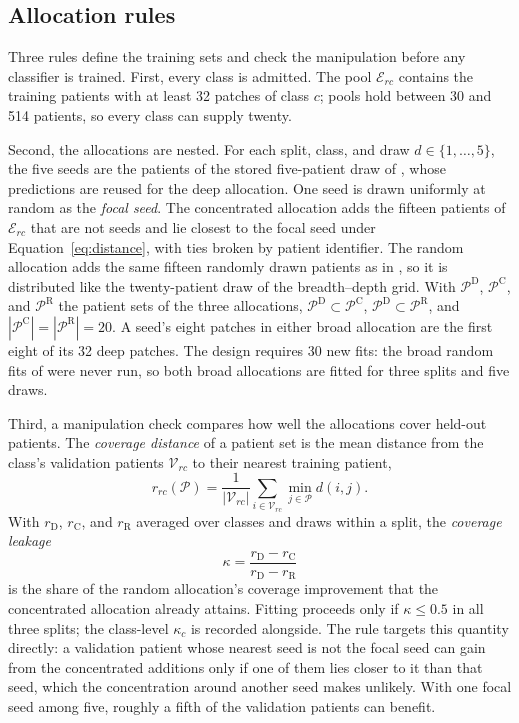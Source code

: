 \documentclass[11pt]{article}
\begin{document}
\subsection{Allocation rules}
\label{sec:allocation}
Three rules define the training sets and check the manipulation before any classifier is trained. First, every class is admitted. The pool $\mathcal E_{rc}$ contains the training patients with at least 32 patches of class $c$; pools hold between 30 and 514 patients, so every class can supply twenty.

Second, the allocations are nested. For each split, class, and draw $d\in\{1,\ldots,5\}$, the five seeds are the patients of the stored five-patient draw of \citet{queisler2026effectiveSupport}, whose predictions are reused for the deep allocation. One seed is drawn uniformly at random as the \emph{focal seed}. The concentrated allocation adds the fifteen patients of $\mathcal E_{rc}$ that are not seeds and lie closest to the focal seed under Equation~\eqref{eq:distance}, with ties broken by patient identifier. The random allocation adds the same fifteen randomly drawn patients as in \citet{queisler2026patientCoverage}, so it is distributed like the twenty-patient draw of the breadth--depth grid. With $\mathcal P^{\mathrm D}$, $\mathcal P^{\mathrm C}$, and $\mathcal P^{\mathrm R}$ the patient sets of the three allocations, $\mathcal P^{\mathrm D}\subset\mathcal P^{\mathrm C}$, $\mathcal P^{\mathrm D}\subset\mathcal P^{\mathrm R}$, and $|\mathcal P^{\mathrm C}|=|\mathcal P^{\mathrm R}|=20$. A seed's eight patches in either broad allocation are the first eight of its 32 deep patches. The design requires 30 new fits: the broad random fits of \citet{queisler2026patientCoverage} were never run, so both broad allocations are fitted for three splits and five draws.

Third, a manipulation check compares how well the allocations cover held-out patients. The \emph{coverage distance} of a patient set is the mean distance from the class's validation patients $\mathcal V_{rc}$ to their nearest training patient,
\begin{equation}
 r_{rc}(\mathcal P)=\frac{1}{|\mathcal V_{rc}|}\sum_{i\in\mathcal V_{rc}}\min_{j\in\mathcal P}d(i,j).
 \label{eq:coverage}
\end{equation}
\noindent With $r_{\mathrm D}$, $r_{\mathrm C}$, and $r_{\mathrm R}$ averaged over classes and draws within a split, the \emph{coverage leakage}
\begin{equation}
 \kappa=\frac{r_{\mathrm D}-r_{\mathrm C}}{r_{\mathrm D}-r_{\mathrm R}}
 \label{eq:leakage}
\end{equation}
\noindent is the share of the random allocation's coverage improvement that the concentrated allocation already attains. Fitting proceeds only if $\kappa\le 0.5$ in all three splits; the class-level $\kappa_c$ is recorded alongside. The rule targets this quantity directly: a validation patient whose nearest seed is not the focal seed can gain from the concentrated additions only if one of them lies closer to it than that seed, which the concentration around another seed makes unlikely. With one focal seed among five, roughly a fifth of the validation patients can benefit.
\end{document}
